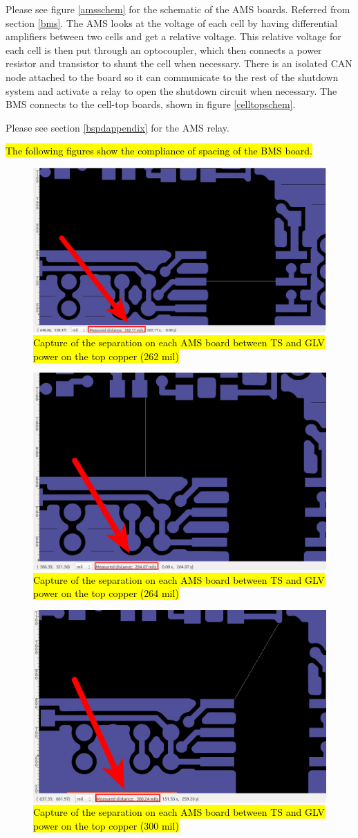 \documentclass{article}
\DeclareRobustCommand{\hlr}[1]{{\sethlcolor{red}\hl{#1}}}
\begin{document}
{%
Please see figure \ref{amsschem} for the schematic of the AMS boards. Referred from section \ref{bms}. The AMS looks at the voltage of each cell by having differential amplifiers between two cells and get a relative voltage. This relative voltage for each cell is then put through an optocoupler, which then connects a power resistor and transistor to shunt the cell when necessary. There is an isolated CAN node attached to the board so it can communicate to the rest of the shutdown system and activate a relay to open the shutdown circuit when necessary. The BMS connects to the cell-top boards, shown in figure \ref{celltopschem}.

Please see section \ref{bspdappendix} for the AMS relay.

\hlr{The following figures show the compliance of spacing of the BMS board.}

\begin{figure}[H]
 \centering
 \includegraphics[width = 0.45 \textwidth]{bmsspace1}
 \caption{\hlr{Capture of the separation on each AMS board between TS and GLV power on the top copper (262 mil)}}
 \label{amsseparation1}
\end{figure}

\begin{figure}[H]
 \centering
 \includegraphics[width = 0.45 \textwidth]{bmsspace2}
 \caption{\hlr{Capture of the separation on each AMS board between TS and GLV power on the top copper (264 mil)}}
 \label{amsseparation2}
\end{figure}

\begin{figure}[H]
 \centering
 \includegraphics[width = 0.45 \textwidth]{bmsspace6}
 \caption{\hlr{Capture of the separation on each AMS board between TS and GLV power on the top copper (300 mil)}}
 \label{amsseparation6}
\end{figure}

}
\end{document}
